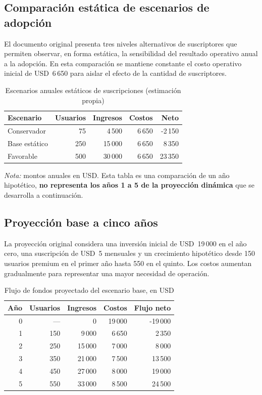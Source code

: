 \subsection{Comparación estática de escenarios de adopción}

El documento original presenta tres niveles alternativos de suscriptores que permiten observar, en forma estática, la sensibilidad del resultado operativo anual a la adopción. En esta comparación se mantiene constante el costo operativo inicial de USD~6\,650 para aislar el efecto de la cantidad de suscriptores.

\begin{table}[htbp]
\centering
\caption{Escenarios anuales estáticos de suscripciones (estimación propia)}
\label{tab:ml-escenarios-estaticos}
\small
\begin{tabularx}{\textwidth}{@{}X r r r r@{}}
\toprule
\textbf{Escenario} & \textbf{Usuarios} & \textbf{Ingresos} & \textbf{Costos} & \textbf{Neto} \\
\midrule
Conservador & 75 & 4\,500 & 6\,650 & -2\,150 \\
Base estático & 250 & 15\,000 & 6\,650 & 8\,350 \\
Favorable & 500 & 30\,000 & 6\,650 & 23\,350 \\
\bottomrule
\end{tabularx}
\end{table}

\noindent\textit{Nota:} montos anuales en USD. Esta tabla es una comparación de un año hipotético, \textbf{no representa los años 1 a 5 de la proyección dinámica} que se desarrolla a continuación.

\subsection{Proyección base a cinco años}

La proyección original considera una inversión inicial de USD~19\,000 en el año cero, una suscripción de USD~5 mensuales y un crecimiento hipotético desde 150 usuarios premium en el primer año hasta 550 en el quinto. Los costos aumentan gradualmente para representar una mayor necesidad de operación.

\begin{table}[htbp]
\centering
\caption{Flujo de fondos proyectado del escenario base, en USD}
\label{tab:ml-flujo-base}
\small
\begin{tabular}{@{}r r r r r@{}}
\toprule
\textbf{Año} & \textbf{Usuarios} & \textbf{Ingresos} & \textbf{Costos} & \textbf{Flujo neto} \\
\midrule
0 & --- & 0 & 19\,000 & -19\,000 \\
1 & 150 & 9\,000 & 6\,650 & 2\,350 \\
2 & 250 & 15\,000 & 7\,000 & 8\,000 \\
3 & 350 & 21\,000 & 7\,500 & 13\,500 \\
4 & 450 & 27\,000 & 8\,000 & 19\,000 \\
5 & 550 & 33\,000 & 8\,500 & 24\,500 \\
\bottomrule
\end{tabular}
\end{table}

